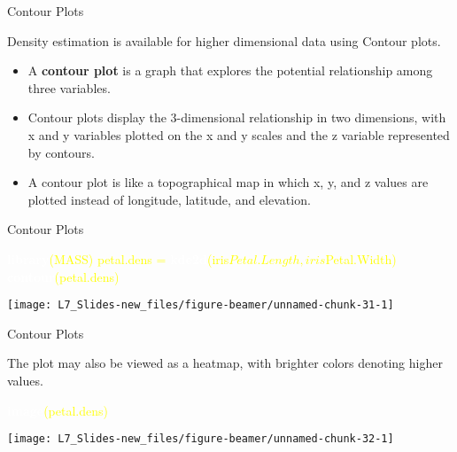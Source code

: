 \documentclass[ignorenonframetext,]{beamer}
\newenvironment{Shaded}{\begin{snugshade}}{\end{snugshade}}
\newcommand{\KeywordTok}[1]{\textcolor{white}{\textbf{{#1}}}}
\newcommand{\NormalTok}[1]{\textcolor{yellow}{{#1}}}
\newcommand{\StringTok}[1]{\textcolor{yellow}{{#1}}}
\begin{document}
\begin{frame}{Contour Plots}

Density estimation is available for higher dimensional data using
Contour plots.

\begin{itemize}
\item
  A \textbf{contour plot} is a graph that explores the potential
  relationship among three variables.
\item
  Contour plots display the 3-dimensional relationship in two
  dimensions, with x and y variables plotted on the x and y scales and
  the z variable represented by contours.
\item
  A contour plot is like a topographical map in which x, y, and z values
  are plotted instead of longitude, latitude, and elevation.
\end{itemize}

\end{frame}

\begin{frame}[fragile]{Contour Plots}

\small

\begin{Shaded}
\begin{Highlighting}[]
\KeywordTok{library}\NormalTok{(MASS)}
\NormalTok{petal.dens =}\StringTok{ }\KeywordTok{kde2d}\NormalTok{(iris$Petal.Length, iris$Petal.Width)}
\KeywordTok{contour}\NormalTok{(petal.dens)}
\end{Highlighting}
\end{Shaded}

\begin{center}\texttt{[image: L7\_Slides-new\_files/figure-beamer/unnamed-chunk-31-1]} \end{center}

\end{frame}

\begin{frame}[fragile]{Contour Plots}

The plot may also be viewed as a heatmap, with brighter colors denoting
higher values. \small

\begin{Shaded}
\begin{Highlighting}[]
\KeywordTok{image}\NormalTok{(petal.dens)}
\end{Highlighting}
\end{Shaded}

\begin{center}\texttt{[image: L7\_Slides-new\_files/figure-beamer/unnamed-chunk-32-1]} \end{center}

\end{frame}
\end{document}
